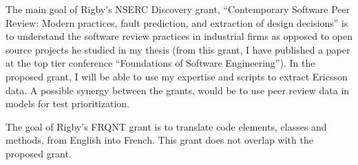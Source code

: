 \documentclass[12pt, letterpaper]{article}
\begin{document}
\fancyhead{}
\pagestyle{fancy}
\renewcommand{\headrulewidth}{0pt}

\begin{center}
\begin{LARGE}
\noindent
{}
\end{LARGE}
\end{center}


The main goal of Rigby's NSERC Discovery grant, “Contemporary Software Peer Review:
Modern practices, fault prediction, and extraction of design decisions” is to
understand the software review practices in industrial firms as opposed to open
source projects he studied in my thesis (from this grant, I have published a
paper at the top tier conference “Foundations of Software Engineering”). 
%
In the proposed grant, I will be able to use my expertise and scripts to
extract Ericsson data. A possible synergy between the grants, would be to use
peer review data in models for test prioritization. 

The goal of Rigby's FRQNT grant is to translate code elements, classes and methods,
from English into French. This grant does not overlap with the proposed grant.
\end{document}
